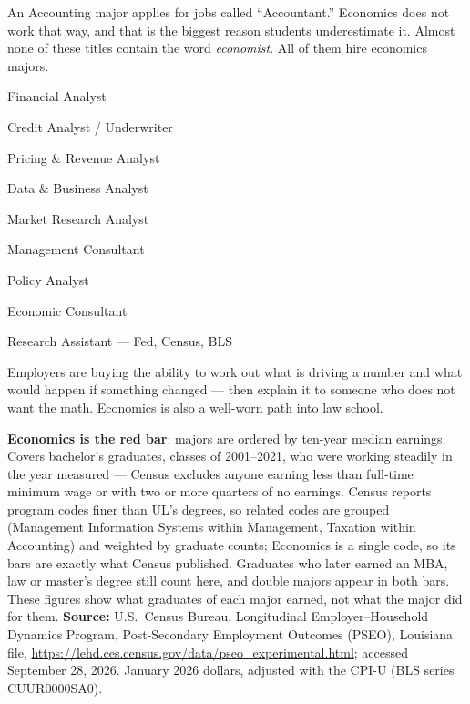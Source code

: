 \documentclass{./template/articlex}
\newcommand{\job}[1]{{\sffamily\color{INK}\fontsize{9}{12}\selectfont #1}\par}
\begin{document}
\begin{singlespace}
\begin{minipage}[t]{0.305\linewidth}
\begin{tcolorbox}[colback=ULRED!4, colframe=ULRED, boxrule=0.9pt, arc=2pt,
                    halign=flush left,
                    left=8pt, right=8pt, top=6pt, bottom=6pt]
  \vspace{3pt}

  {\sffamily\color{SOFT}\fontsize{8.6}{10.6}\selectfont\raggedright
  An Accounting major applies for jobs called ``Accountant.'' Economics does not
  work that way, and that is the biggest reason students underestimate it.
  Almost none of these titles contain the word \emph{economist}. All of them
  hire economics majors.\par}

  \vspace{6pt}

  \job{Financial Analyst}
  \job{Credit Analyst / Underwriter}
  \job{Pricing \& Revenue Analyst}
  \job{Data \& Business Analyst}
  \job{Market Research Analyst}
  \job{Management Consultant}
  \job{Policy Analyst}
  \job{Economic Consultant}
  \job{Research Assistant --- Fed, Census, BLS}

  \vspace{5pt}

  {\sffamily\color{SOFT}\fontsize{8.4}{10.4}\selectfont\raggedright
  Employers are buying the ability to work out what is driving a number and what
  would happen if something changed --- then explain it to someone who does not
  want the math. Economics is also a well-worn path into law school.\par}
  \end{tcolorbox}
\end{minipage}

\vspace{7pt}

{\sffamily\color{SOFT}\fontsize{7.2}{8.6}\selectfont\raggedright
\textbf{Economics is the red bar}; majors are ordered by ten-year median
earnings. Covers bachelor's graduates, classes of 2001--2021, who were working
steadily in the year measured --- Census excludes anyone earning less than
full-time minimum wage or with two or more quarters of no earnings. Census
reports program codes finer than UL's degrees, so related codes are grouped
(Management Information Systems within Management, Taxation within Accounting)
and weighted by graduate counts; Economics is a single code, so its bars are
exactly what Census published. Graduates who later earned an MBA, law or
master's degree still count here, and double majors appear in both bars. These
figures show what graduates of each major earned, not what the major did for
them. \textbf{Source:} U.S.\ Census Bureau, Longitudinal Employer--Household
Dynamics Program, Post-Secondary Employment Outcomes (PSEO), Louisiana file,
\url{https://lehd.ces.census.gov/data/pseo_experimental.html}; accessed
September 28, 2026. January 2026 dollars, adjusted with the CPI-U (BLS series
CUUR0000SA0).\par}

\end{singlespace}
\end{document}
